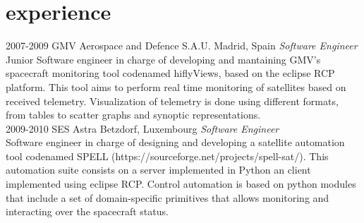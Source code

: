 \documentclass[]{friggeri-cv}
\begin{document}

\section{experience}

\begin{entrylist}
\entry
{2007-2009}
{GMV Aerospace and Defence S.A.U.}
{Madrid, Spain}
{\emph{Software Engineer} \\
Junior Software engineer in charge of developing and mantaining GMV's spacecraft monitoring tool codenamed hiflyViews, based on the eclipse RCP platform.
This tool aims to perform real time monitoring of satellites based on received telemetry. Visualization of telemetry is done using different formats,
from tables to scatter graphs and synoptic representations.} \\
\entry
{2009-2010}
{SES Astra}
{Betzdorf, Luxembourg}
{\emph{Software Engineer} \\
Software engineer in charge of designing and developing a satellite automation tool codenamed SPELL (https://sourceforge.net/projects/spell-sat/).
This automation suite consists on a server implemented in Python an client implemented using eclipse RCP.
Control automation is based on python modules that include a set of domain-specific primitives that allows monitoring and interacting over the
spacecraft status.} \\
\end{entrylist}
\end{document}
